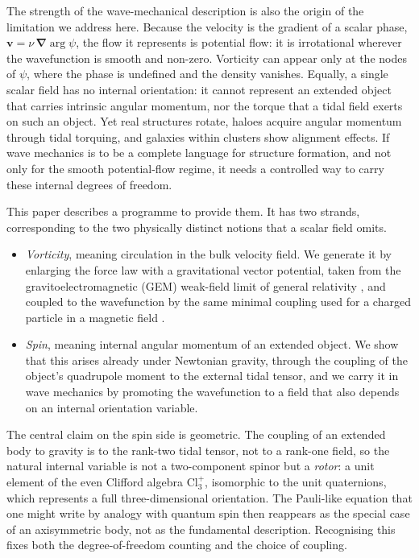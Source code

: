 \documentclass[11pt,a4paper]{article}
\newcommand{\grad}{\bm{\nabla}}
\begin{document}
The strength of the wave-mechanical description is also the origin of the limitation we
address here. Because the velocity is the gradient of a scalar phase,
$\mathbf{v} = \nu\,\grad\arg\psi$, the flow it represents is potential flow: it is
irrotational wherever the wavefunction is smooth and non-zero. Vorticity can appear
only at the nodes of $\psi$, where the phase is undefined and the density vanishes.
Equally, a single scalar field has no internal orientation: it cannot represent an
extended object that carries intrinsic angular momentum, nor the torque that a tidal
field exerts on such an object. Yet real structures rotate, haloes acquire angular
momentum through tidal torquing, and galaxies within clusters show alignment effects.
If wave mechanics is to be a complete language for structure formation, and not only
for the smooth potential-flow regime, it needs a controlled way to carry these internal
degrees of freedom.

This paper describes a programme to provide them. It has two strands, corresponding to
the two physically distinct notions that a scalar field omits.

\begin{itemize}
  \item \emph{Vorticity}, meaning circulation in the bulk velocity field. We generate
  it by enlarging the force law with a gravitational vector potential, taken from the
  gravitoelectromagnetic (GEM) weak-field limit of general relativity
  \citep{mashhoon2003}, and coupled to the wavefunction by the same minimal coupling
  used for a charged particle in a magnetic field \citep{watanabe2000}.
  \item \emph{Spin}, meaning internal angular momentum of an extended object. We show
  that this arises already under Newtonian gravity, through the coupling of the object's
  quadrupole moment to the external tidal tensor, and we carry it in wave mechanics by
  promoting the wavefunction to a field that also depends on an internal orientation
  variable.
\end{itemize}

The central claim on the spin side is geometric. The coupling of an extended body to
gravity is to the rank-two tidal tensor, not to a rank-one field, so the natural
internal variable is not a two-component spinor but a \emph{rotor}: a unit element of
the even Clifford algebra $\mathrm{Cl}_3^{+}$, isomorphic to the unit quaternions,
which represents a full three-dimensional orientation. The Pauli-like equation that one
might write by analogy with quantum spin then reappears as the special case of an
axisymmetric body, not as the fundamental description. Recognising this fixes both the
degree-of-freedom counting and the choice of coupling.
\end{document}
